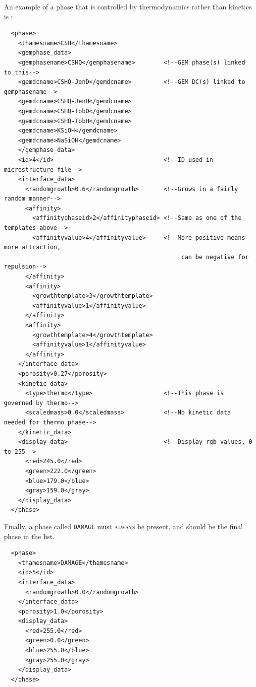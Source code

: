\documentclass{article}
\begin{document}
\normalsize{ }
An example of a phase that is controlled by thermodynamics rather than
kinetics is :

\scriptsize{
    \begin{lstlisting}
  <phase>
    <thamesname>CSH</thamesname>
    <gemphase_data>
    <gemphasename>CSHQ</gemphasename>        <!--GEM phase(s) linked to this-->
    <gemdcname>CSHQ-JenD</gemdcname>         <!--GEM DC(s) linked to gemphasename-->
    <gemdcname>CSHQ-JenH</gemdcname>
    <gemdcname>CSHQ-TobD</gemdcname>
    <gemdcname>CSHQ-TobH</gemdcname>
    <gemdcname>KSiOH</gemdcname>
    <gemdcname>NaSiOH</gemdcname>
    </gemphase_data>
    <id>4</id>                               <!--ID used in microstructure file-->
    <interface_data>
      <randomgrowth>0.6</randomgrowth>       <!--Grows in a fairly random manner-->
      <affinity>
        <affinityphaseid>2</affinityphaseid> <!--Same as one of the templates above-->
        <affinityvalue>4</affinityvalue>     <!--More positive means more attraction,
                                                  can be negative for repulsion-->
      </affinity>
      <affinity>
        <growthtemplate>3</growthtemplate>
        <affinityvalue>1</affinityvalue> 
      </affinity>
      <affinity>
        <growthtemplate>4</growthtemplate>
        <affinityvalue>1</affinityvalue>
      </affinity>
    </interface_data>
    <porosity>0.27</porosity>
    <kinetic_data>
      <type>thermo</type>                    <!--This phase is governed by thermo-->
      <scaledmass>0.0</scaledmass>           <!--No kinetic data needed for thermo phase-->
    </kinetic_data>
    <display_data>                           <!--Display rgb values, 0 to 255-->
      <red>245.0</red>
      <green>222.0</green>
      <blue>179.0</blue>
      <gray>159.0</gray>
    </display_data>
  </phase>

    \end{lstlisting}
}


\normalsize{ }
Finally, a phase called \verb!DAMAGE! must \textsc{always} be present, and
should be the final phase in the list.

\scriptsize{
    \begin{lstlisting}
  <phase>
    <thamesname>DAMAGE</thamesname>
    <id>5</id>
    <interface_data>
      <randomgrowth>0.0</randomgrowth>
    </interface_data>
    <porosity>1.0</porosity>
    <display_data>
      <red>255.0</red>
      <green>0.0</green>
      <blue>255.0</blue>
      <gray>255.0</gray>
    </display_data>
  </phase>
    \end{lstlisting}
}
\end{document}

